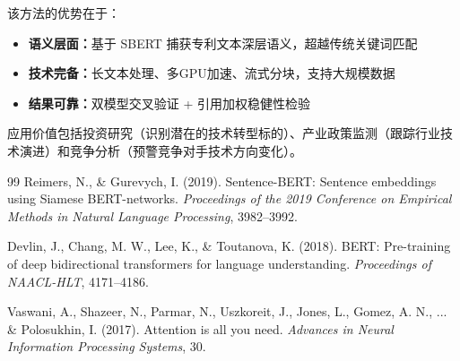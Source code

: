 \documentclass[12pt,a4paper]{article}
\theoremstyle{definition}
\begin{document}
该方法的优势在于：
\begin{itemize}
    \item \textbf{语义层面：}基于 SBERT 捕获专利文本深层语义，超越传统关键词匹配
    \item \textbf{技术完备：}长文本处理、多GPU加速、流式分块，支持大规模数据
    \item \textbf{结果可靠：}双模型交叉验证 + 引用加权稳健性检验
\end{itemize}

应用价值包括投资研究（识别潜在的技术转型标的）、产业政策监测（跟踪行业技术演进）和竞争分析（预警竞争对手技术方向变化）。

\begin{thebibliography}{99}
Reimers, N., \& Gurevych, I. (2019). Sentence-BERT: Sentence embeddings using Siamese BERT-networks. \textit{Proceedings of the 2019 Conference on Empirical Methods in Natural Language Processing}, 3982--3992.

Devlin, J., Chang, M. W., Lee, K., \& Toutanova, K. (2018). BERT: Pre-training of deep bidirectional transformers for language understanding. \textit{Proceedings of NAACL-HLT}, 4171--4186.

Vaswani, A., Shazeer, N., Parmar, N., Uszkoreit, J., Jones, L., Gomez, A. N., ... \& Polosukhin, I. (2017). Attention is all you need. \textit{Advances in Neural Information Processing Systems}, 30.
\end{thebibliography}
\end{document}
